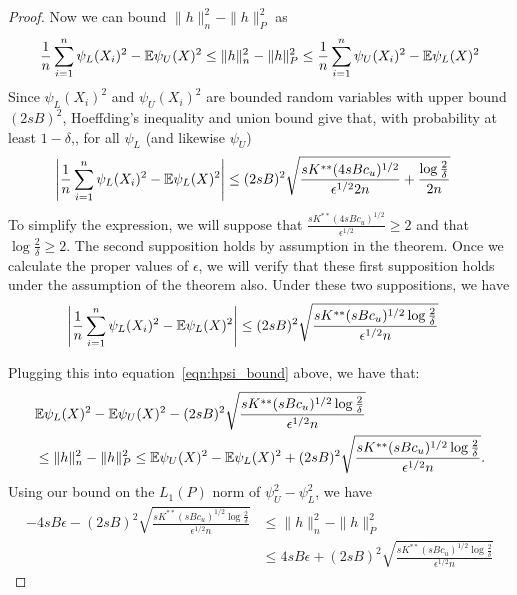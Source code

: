 \begin{proof}
Now we can bound $\| h \|_n^2 - \| h \|_P^2$ as
\begin{align}
\frac{1}{n} \sum_{i=1}^n \psi_L(X_i)^2 - {\mathbb E} \psi_U(X)^2  \leq
    \| h \|_n^2 - \| h \|_P^2 \leq
  \frac{1}{n} \sum_{i=1}^n \psi_U(X_i)^2 - {\mathbb E} \psi_L(X)^2  \label{eqn:hpsi_bound}
\end{align}
Since 
$\psi_L(X_i)^2$ and $\psi_U(X_i)^2$ are bounded random variables with
upper bound $(2sB)^2$, Hoeffding's inequality and union bound give that,
with probability at least $1-\delta$,, for all $\psi_L$ (and likewise $\psi_U$)
\begin{align*}
\left| \frac{1}{n} \sum_{i=1}^n \psi_L(X_i)^2 - 
   {\mathbb E} \psi_L(X)^2 \right| &\leq (2sB)^2 \sqrt{ \frac{sK^{**} (4sBc_u)^{1/2}}{\epsilon^{1/2}2n} + \frac{\log\frac{2}{\delta}}{2n}} 
\end{align*}
To simplify the expression, we will suppose that $\frac{sK^{**} (4sBc_u)^{1/2}}{\epsilon^{1/2}} \geq 2$ and that $\log \frac{2}{\delta} \geq 2$. The second supposition holds by assumption in the theorem. Once we calculate the proper values of $\epsilon$, we will verify that these first supposition holds under the assumption of the theorem also. Under these two suppositions, we have
\begin{align}
\label{eqn:simplified_psi_concentration}
\left| \frac{1}{n} \sum_{i=1}^n \psi_L(X_i)^2 - 
   {\mathbb E} \psi_L(X)^2 \right| &\leq (2sB)^2 \sqrt{ \frac{ sK^{**} (sBc_u)^{1/2} \log \frac{2}{\delta}}{ \epsilon^{1/2} n} }
\end{align}

Plugging this into equation~\eqref{eqn:hpsi_bound} above, we have that:
\begin{align*}
& {\mathbb E} \psi_L(X)^2 - {\mathbb E} \psi_U(X)^2 - 
(2sB)^2 \sqrt{ \frac{ sK^{**} (sBc_u)^{1/2} \log \frac{2}{\delta}}{ \epsilon^{1/2} n} } \\
 & \leq 
 \| h \|_n^2 - \| h \|_P^2 \leq
{\mathbb E} \psi_U(X)^2 - {\mathbb E} \psi_L(X)^2 + 
(2sB)^2 \sqrt{ \frac{ sK^{**} (sBc_u)^{1/2} \log \frac{2}{\delta}}{ \epsilon^{1/2} n} }.
\end{align*}
Using our bound on the $L_1(P)$ norm of $\psi_U^2 - \psi_L^2$, we have
\begin{align*}
-4sB\epsilon - 
(2sB)^2 \sqrt{ \frac{ sK^{**} (sBc_u)^{1/2} \log \frac{2}{\delta}}{ \epsilon^{1/2} n} } &\leq 
 \| h \|_n^2 - \| h \|_P^2 \\
& \leq 4sB\epsilon + 
(2sB)^2 \sqrt{ \frac{ sK^{**} (sBc_u)^{1/2} \log \frac{2}{\delta}}{ \epsilon^{1/2} n} }
\end{align*}


\end{proof}

